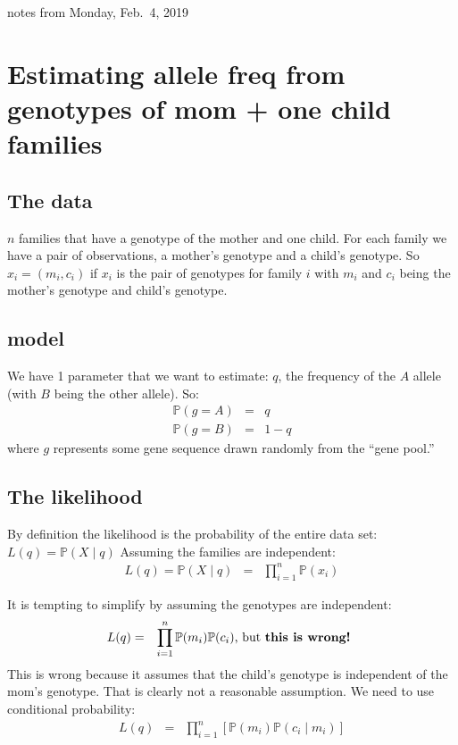 \documentclass[11pt]{article}
\renewcommand{\Pr}{\mathbb{P}}
\begin{document}
notes from Monday, Feb.~4, 2019 \\
\section{Estimating allele freq from genotypes of mom + one child families}

\subsection{The data}
$n$ families that have a genotype of the mother and one child.
For each family we have a pair of observations, a mother's genotype and a child's genotype.
So $x_i = (m_i, c_i)$ if $x_i$ is the pair of genotypes
for family $i$ with  $m_i$ and $c_i$ being the mother's genotype and child's genotype.

\subsection{model}
We have 1 parameter that we want to estimate: $q$, the frequency of the $A$ allele (with $B$ being the other allele). So:
\begin{eqnarray}
  \Pr(g = A) & = & q \\
  \Pr(g = B) & = & 1- q
\end{eqnarray}
where $g$ represents some gene sequence drawn randomly from the ``gene pool.''

\subsection{The likelihood}
By definition the likelihood is the probability of the entire data set: $L(q) = \Pr(X\mid q)$
Assuming the families are independent:
\begin{eqnarray}
  L(q) = \Pr(X\mid q) & = & \prod_{i=1}^{n}\Pr(x_i) 
\end{eqnarray}

It is tempting to simplify by assuming the genotypes are independent:
\begin{eqnarray}\nonumber
  L(q) & = & \prod_{i=1}^{n}\Pr(m_i)\Pr(c_i) \mbox{, but \bf{this is wrong!} } 
\end{eqnarray}
This is wrong because it assumes that the child's genotype is independent of the mom's genotype. 
That is clearly not a reasonable assumption.
We need to use conditional probability:
\begin{eqnarray}
  L(q) & = & \prod_{i=1}^{n}\left[\Pr\left(m_i\right)\Pr\left(c_i\mid m_i\right)\right]
\end{eqnarray}
\end{document}

